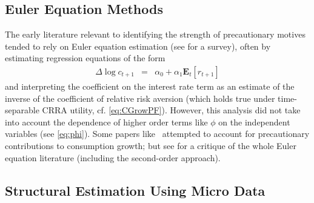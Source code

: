 
\subsection{Euler Equation Methods}

The early literature relevant to identifying the strength
of precautionary motives tended to rely on Euler
equation estimation (see \cite{browning&lusardi:jel} for a survey),
often by estimating regression equations of the form
\begin{eqnarray}
  \Delta \log {c}_{t+1} & = & \alpha_{0}+\alpha_{1} \mathbf{E}_{t}[r_{t+1}]
\end{eqnarray}
and interpreting the coefficient on the interest rate term as an estimate
of the inverse of the coefficient of relative risk aversion (which holds true
under time-separable CRRA utility, cf. \eqref{eq:CGrowPF}).
However, this analysis did not take into account the dependence of higher order
terms like $\phi$ on the independent variables (see \eqref{eq:phi}).  Some papers like~\cite{dynan:precautionary}
attempted to account for precautionary contributions to consumption growth;
but see \cite{carroll:death} for a critique of the whole Euler equation literature
(including the second-order approach).

\subsection{Structural Estimation Using Micro Data}

